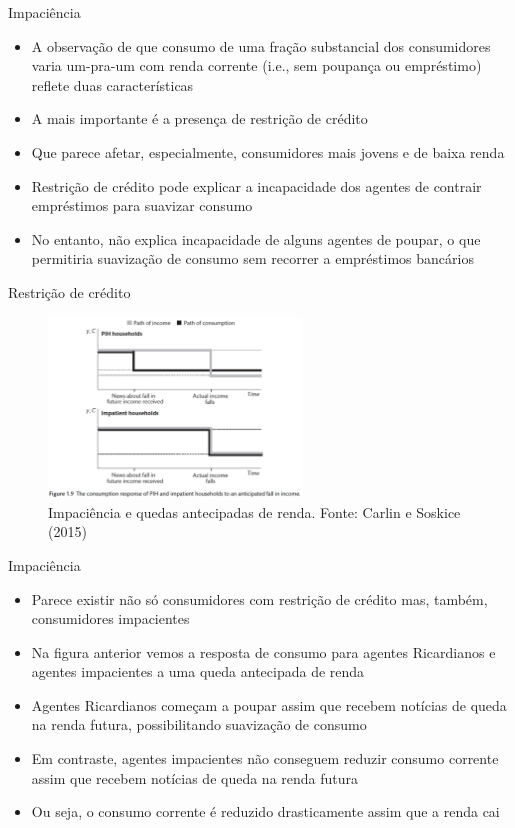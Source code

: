 \documentclass[10pt]{beamer}
\begin{document}
\begin{frame}
    {Impaciência}
    \begin{itemize}
        \item A observação de que consumo de uma fração substancial dos consumidores varia um-pra-um com renda corrente (i.e., sem poupança ou empréstimo) reflete duas características\bigskip
        \item A mais importante é a presença de restrição de crédito\bigskip
        \item Que parece afetar, especialmente, consumidores mais jovens e de baixa renda\bigskip
        \item Restrição de crédito pode explicar a incapacidade dos agentes de contrair empréstimos para suavizar consumo\bigskip
        \item No entanto, não explica incapacidade de alguns agentes de poupar, o que permitiria suavização de consumo sem recorrer a empréstimos bancários
    \end{itemize}
\end{frame}

\begin{frame}
    {Restrição de crédito}
    \begin{figure}
        \centering
        \includegraphics[width=0.6\textwidth]{./figures/aula7_fig15.PNG}
        \caption{Impaciência e quedas antecipadas de renda. Fonte: Carlin e Soskice (2015)}
    \end{figure}
\end{frame}

\begin{frame}
    {Impaciência}
    \begin{itemize}
        \item Parece existir não só consumidores com restrição de crédito mas, também, consumidores impacientes\bigskip
        \item Na figura anterior vemos a resposta de consumo para agentes Ricardianos e agentes impacientes a uma queda antecipada de renda\bigskip
        \item Agentes Ricardianos começam a poupar assim que recebem notícias de queda na renda futura, possibilitando suavização de consumo\bigskip
        \item Em contraste, agentes impacientes não conseguem reduzir consumo corrente assim que recebem notícias de queda na renda futura\bigskip
        \item Ou seja, o consumo corrente é reduzido drasticamente assim que a renda cai        
    \end{itemize}
\end{frame}
\end{document}
